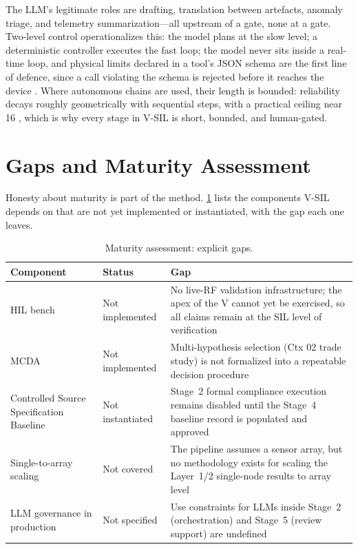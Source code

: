 \documentclass[11pt,a4paper]{article}
\begin{document}
The LLM's legitimate roles are drafting, translation between artefacts, anomaly triage, and
telemetry summarization---all upstream of a gate, none at a gate. Two-level control operationalizes
this: the model plans at the slow level; a deterministic controller executes the fast loop; the
model never sits inside a real-time loop, and physical limits declared in a tool's JSON schema are
the first line of defence, since a call violating the schema is rejected before it reaches the
device \cite{tooluse2026,mcp2025}. Where autonomous chains are used, their length is bounded:
reliability decays roughly geometrically with sequential steps, with a practical ceiling near 16
\cite{mittal2026}, which is why every stage in V-SIL is short, bounded, and human-gated.

\section{Gaps and Maturity Assessment}
\label{sec:gaps}

Honesty about maturity is part of the method. \cref{tab:gaps} lists the components V-SIL depends
on that are not yet implemented or instantiated, with the gap each one leaves.

\begin{table}[htbp]
\centering
\caption{Maturity assessment: explicit gaps.}
\label{tab:gaps}
\small
\begin{tabular}{@{}lp{3.1cm}p{7.2cm}@{}}
\toprule
\textbf{Component} & \textbf{Status} & \textbf{Gap} \\
\midrule
HIL bench & Not implemented & No live-RF validation infrastructure; the apex of the V cannot yet be exercised, so all claims remain at the SIL level of verification \\
MCDA \cite{mcda2026} & Not implemented & Multi-hypothesis selection (Ctx 02 trade study) is not formalized into a repeatable decision procedure \\
Controlled Source Specification Baseline & Not instantiated & Stage~2 formal compliance execution remains disabled until the Stage~4 baseline record is populated and approved \\
Single-to-array scaling & Not covered & The pipeline assumes a sensor array, but no methodology exists for scaling the Layer~1/2 single-node results to array level \\
LLM governance in production & Not specified & Use constraints for LLMs inside Stage~2 (orchestration) and Stage~5 (review support) are undefined \\
\bottomrule
\end{tabular}
\end{table}
\end{document}
